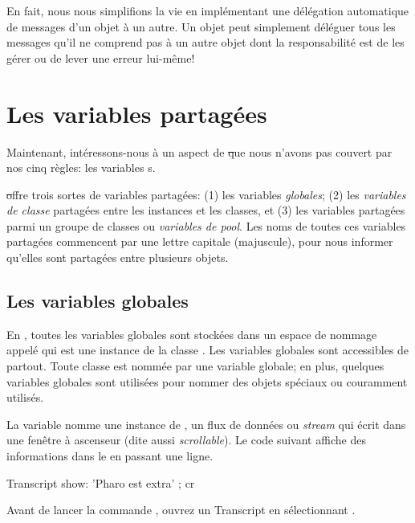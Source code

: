 \documentclass[a4paper,10pt,twoside]{book}
\begin{document}
En fait, nous nous simplifions la vie en implémentant une 
délégation automatique de messages d'un objet à un autre.
Un objet  peut simplement déléguer tous les messages
qu'il ne comprend pas à un autre objet dont la responsabilité est de les gérer ou
de lever une erreur lui-même!

\section{Les variables partagées}

Maintenant, intéressons-nous à un aspect de \st que nous n'avons pas couvert
par nos cinq règles: les variables s.

\st offre trois sortes de variables partagées: (1) les variables \emph{globales}; (2) les \emph{variables de classe} partagées entre les instances et les classes, et (3) les variables partagées parmi un groupe de classes ou \emph{variables de pool}.  Les noms de toutes ces variables partagées commencent par une lettre capitale (majuscule), pour nous informer qu'elles sont partagées entre plusieurs objets.

\subsection{Les variables globales}
En \pharo, toutes les variables globales sont stockées dans un espace de nommage appelé  qui est une instance de la classe .
Les variables globales sont accessibles de partout.
Toute classe est nommée par une variable globale; en plus, quelques variables globales sont utilisées pour nommer des objets spéciaux ou couramment utilisés.  

La variable  nomme une instance de , un flux de données ou \emph{stream} qui écrit dans une fenêtre à ascenseur (dite aussi \emph{scrollable}).
Le code suivant affiche des informations dans le  en passant une ligne.

\begin{code}{}
Transcript show: 'Pharo est extra' ; cr
\end{code} %

\noindent
Avant de lancer la commande , ouvrez un Transcript en 
sélectionnant . %
\end{document}
